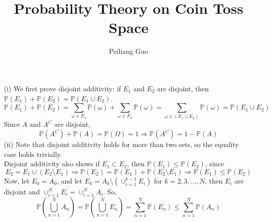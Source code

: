 \documentclass[12pt]{article}
\newenvironment{problem}[2][Problem]{\begin{trivlist}
		\item[\hskip \labelsep {\bfseries #1}\hskip \labelsep {\bfseries #2.}]}{\end{trivlist}}
\begin{document}
	
	\title{Probability Theory on Coin Toss Space}
	\author{Peiliang Guo}
	\maketitle
	\begin{problem}{1}	\end{problem}
	(i) We first prove disjoint additivity: if $E_1$ and $E_2$ are disjoint, then $\mathbb{P}(E_1)+\mathbb{P}(E_2) = \mathbb{P}(E_1\cup E_2)$.
	$$\mathbb{P}(E_1)+\mathbb{P}(E_2) = \sum_{\omega\in E_1}\mathbb{P}(\omega)+ \sum_{\omega\in E_2}\mathbb{P}(\omega)=\sum_{\omega\in(E_1\cup E_2)}\mathbb{P}(\omega)=\mathbb{P}(E_1\cup E_2)$$
Since $A$ and $A^C$ are disjoint, $$\mathbb{P}(A^C)+\mathbb{P}(A)=\mathbb{P}(\Omega) = 1 \Rightarrow \mathbb{P}(A^C) = 1-\mathbb{P}(A)$$
	(ii) Note that disjoint additivity holds for more than two sets, so the equality case holds trivially. \\
	Disjoint additivity also shows if $E_1\subset E_2$, then $\mathbb{P}(E_1)\le\mathbb{P}(E_2)$, since $$E_2 = E_1\cup(E_2\setminus E_1)\Rightarrow \mathbb{P}(E_2) = \mathbb{P}(E_1)+\mathbb{P}(E_2\setminus E_1)\Rightarrow \mathbb{P}(E_1)\le\mathbb{P}(E_2)$$
	Now, let $E_0=A_0$, and let $E_k = A_k\setminus(\cup_{i=1}^{k-1}E_i)$ for $k=2,3,...,N$, then $E_i$ are disjoint and $\cup_{i=1}^NE_i = \cup_{i=1}^N A_i$. So, 
	$$\mathbb{P}\left(\bigcup_{n=1}^N A_n\right)=\mathbb{P}\left(\bigcup_{n=1}^N E_n\right)=\sum_{n=1}^N\mathbb{P}(E_n)\le \sum_{n=1}^N\mathbb{P}(A_n)$$
	
\end{document}
